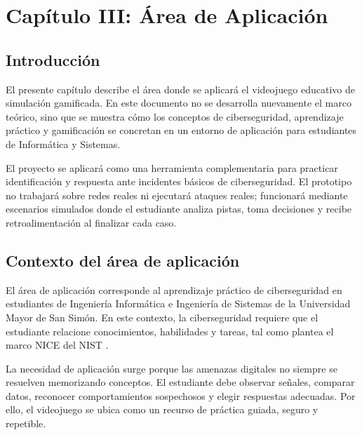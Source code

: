 \section[Cap\'{i}tulo III: \'{A}rea de Aplicaci\'{o}n]{\centering Cap\'{i}tulo III: \'{A}rea de Aplicaci\'{o}n}

\subsection{Introducci\'{o}n}

El presente cap\'{i}tulo describe el \'{a}rea donde se aplicar\'{a} el videojuego educativo de simulaci\'{o}n gamificada. En este documento no se desarrolla nuevamente el marco te\'{o}rico, sino que se muestra c\'{o}mo los conceptos de ciberseguridad, aprendizaje pr\'{a}ctico y gamificaci\'{o}n se concretan en un entorno de aplicaci\'{o}n para estudiantes de Inform\'{a}tica y Sistemas.

El proyecto se aplicar\'{a} como una herramienta complementaria para practicar identificaci\'{o}n y respuesta ante incidentes b\'{a}sicos de ciberseguridad. El prototipo no trabajar\'{a} sobre redes reales ni ejecutar\'{a} ataques reales; funcionar\'{a} mediante escenarios simulados donde el estudiante analiza pistas, toma decisiones y recibe retroalimentaci\'{o}n al finalizar cada caso.

\subsection{Contexto del \'{a}rea de aplicaci\'{o}n}

El \'{a}rea de aplicaci\'{o}n corresponde al aprendizaje pr\'{a}ctico de ciberseguridad en estudiantes de Ingenier\'{i}a Inform\'{a}tica e Ingenier\'{i}a de Sistemas de la Universidad Mayor de San Sim\'{o}n. En este contexto, la ciberseguridad requiere que el estudiante relacione conocimientos, habilidades y tareas, tal como plantea el marco NICE del NIST \parencite{nist2020nice}.

La necesidad de aplicaci\'{o}n surge porque las amenazas digitales no siempre se resuelven memorizando conceptos. El estudiante debe observar se\~{n}ales, comparar datos, reconocer comportamientos sospechosos y elegir respuestas adecuadas. Por ello, el videojuego se ubica como un recurso de pr\'{a}ctica guiada, seguro y repetible.

